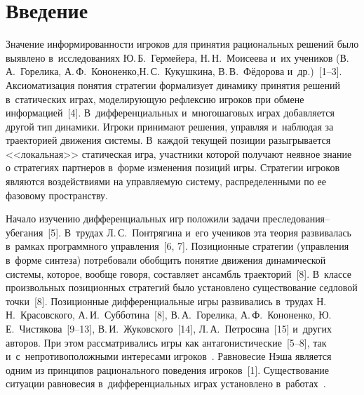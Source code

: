 


\thispagestyle{headings}

\begin{multicols}{2}

\label{st\stat}

\section{Введение}

    Значение информированности игроков для принятия рациональных решений 
было выявлено в~исследованиях Ю.\,Б.~Гермейера, Н.\,Н.~Моисеева и~их учеников 
(В.\,А.~Горелика, А.\,Ф.~Кононенко,\linebreak Н.\,С.~Кукушкина, В.\,В.~Фёдорова  
и~др.)~[1--3]. Ак\-сиоматизация понятия стратегии формализует динамику принятия 
решений в~статических играх, моделиру\-ющую рефлексию игроков при обмене 
информацией~[4]. В~дифференциальных и~многошаговых играх добавляется другой 
тип динамики. Игроки принимают решения, управляя и~наблюдая за траекторией 
движения системы. В~каждой текущей позиции разыгрывается <<локальная>> 
статическая игра, участники которой получают неявное знание о стратегиях 
партнеров в~форме изменения позиций игры. Стратегии игроков являются 
воздействиями на управляемую систему, распределенными по ее фазовому 
пространству. 
    
    Начало изучению дифференциальных игр положили задачи преследования--убегания~[5]. 
    В~трудах Л.\,С.~Понтрягина и~его учеников эта теория развивалась 
в~рамках программного управления~[6, 7]. Позиционные стратегии (управ\-ле\-ния 
в~форме синтеза) потребовали обобщить понятие движения динамической сис\-те\-мы, 
которое, вообще говоря, со\-став\-ля\-ет ансамбль траекторий~[8]. В~классе 
произвольных позиционных стратегий было уста\-нов\-ле\-но существование седловой 
точки~[8]. Позиционные дифференциальные игры развивались в~трудах 
Н.\,Н.~Красовского, А.\,И.~Субботина~[8], В.\,А.~Горелика, А.\,Ф.~Кононенко, 
Ю.\,Е.~Чистякова~[9--13], В.\,И.~Жуковского~[14], Л.\,А.~Петросяна~[15] и~других 
авторов. При этом рассматривались игры как антагонистические~[5--8], так 
и~с~непротивоположными интересами  
игроков~\cite{1-vas, 9-vas, 10-vas, 11-vas, 12-vas, 13-vas, 14-vas, 15-vas}. 
Равновесие Нэша является одним из принципов рационального поведения 
игроков~[1]. Существование ситуации равновесия в~дифференциальных играх 
установлено в~работах~\cite{13-vas, 12-vas}. 
    

\end{multicols}
